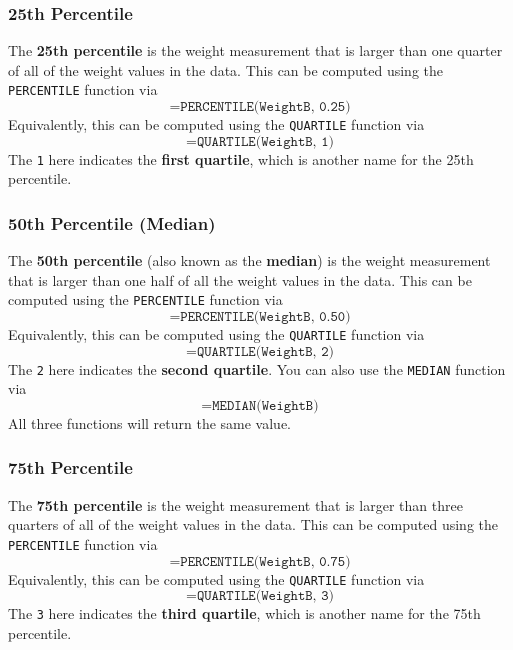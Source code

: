\subsubsection{25th Percentile}
%
The \textbf{25th percentile} is the weight measurement that is larger than one quarter of all of the weight values in the data. This can be computed using the \texttt{PERCENTILE} function via
\begin{equation}
    \texttt{=PERCENTILE(WeightB, 0.25)}
    \label{eq:00.percentile.25}
\end{equation}
Equivalently, this can be computed using the \texttt{QUARTILE} function via
\begin{equation}
    \texttt{=QUARTILE(WeightB, 1)}
\end{equation}
The \texttt{1} here indicates the \textbf{first quartile}, which is another name for the 25th percentile.
%
\subsubsection{50th Percentile (Median)}
%
The \textbf{50th percentile} (also known as the \textbf{median}) is the weight measurement that is larger than one half of all the weight values in the data. This can be computed using the \texttt{PERCENTILE} function via
\begin{equation}
    \texttt{=PERCENTILE(WeightB, 0.50)}
    \label{eq:00.percentile.50}
\end{equation}
Equivalently, this can be computed using the \texttt{QUARTILE} function via
\begin{equation}
    \texttt{=QUARTILE(WeightB, 2)}
\end{equation}
The \texttt{2} here indicates the \textbf{second quartile}. You can also use the \texttt{MEDIAN} function via
\begin{equation}
    \texttt{=MEDIAN(WeightB)}
    \label{eq:00.median}
\end{equation}
All three functions will return the same value.
%
\subsubsection{75th Percentile}
%
The \textbf{75th percentile} is the weight measurement that is larger than three quarters of all of the weight values in the data. This can be computed using the \texttt{PERCENTILE} function via
\begin{equation}
    \texttt{=PERCENTILE(WeightB, 0.75)}
    \label{eq:00.percentile.75}
\end{equation}
Equivalently, this can be computed using the \texttt{QUARTILE} function via
\begin{equation}
    \texttt{=QUARTILE(WeightB, 3)}
\end{equation}
The \texttt{3} here indicates the \textbf{third quartile}, which is another name for the 75th percentile.
%
